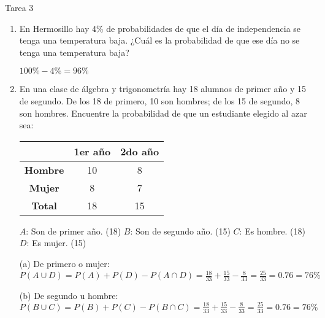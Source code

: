 \documentclass[a4paper, 12pt]{article}
\newcommand{\Pspace}{0.5cm}
\newcommand{\Aspace}{0.2cm}
\begin{document}
\newpage
\begin{center}
    { \LARGE Tarea 3}
\end{center}

\begin{enumerate}
    \item En Hermosillo hay 4\% de probabilidades de que el día de independencia se tenga una temperatura baja. ¿Cuál es la probabilidad de que ese día no se tenga una temperatura baja?
    \vspace{\Aspace} \par
    { \color{azul} $100\% - 4\% = 96\%$ }


    \vspace{\Pspace}
    \item En una clase de álgebra y trigonometría hay 18 alumnos de primer año y 15 de segundo. De los 18 de primero, 10 son hombres; de los 15 de segundo, 8 son hombres. Encuentre la probabilidad de que un estudiante elegido al azar sea:
        \begin{table}[h] \hspace{2em}
        \begin{tabular}{c|c c}  %
        \hline
        & \textbf{1er año} & \textbf{2do año} \\
        \hline
        \textbf{Hombre} & 10 & 8 \\
        \textbf{Mujer}  & 8 & 7 \\
        \hline
        \textbf{Total}  & 18 & 15 \\
        \hline
        \end{tabular}
    \end{table}
    
    $A$: Son de primer año. (18)
    \newline $B$: Son de segundo año. (15)
    \newline $C$: Es hombre. (18)
    \newline $D$: Es mujer. (15)

    \vspace{\Aspace} \par
    (a) De primero o mujer:
        \\ { \color{azul} $P(A \cup D) = P(A) + P(D) - P(A \cap D) = \frac{18}{33} + \frac{15}{33} - \frac{8}{33} = \frac{25}{33} = 0{.}76 = 76\%$ }

    \vspace{\Aspace}
    (b) De segundo u hombre:
    \\ { \color{azul} $P(B \cup C) = P(B) + P(C) - P(B \cap C) = \frac{18}{33} + \frac{15}{33} - \frac{8}{33} = \frac{25}{33} = 0{.}76 = 76\%$ }



\end{enumerate}
\end{document}
